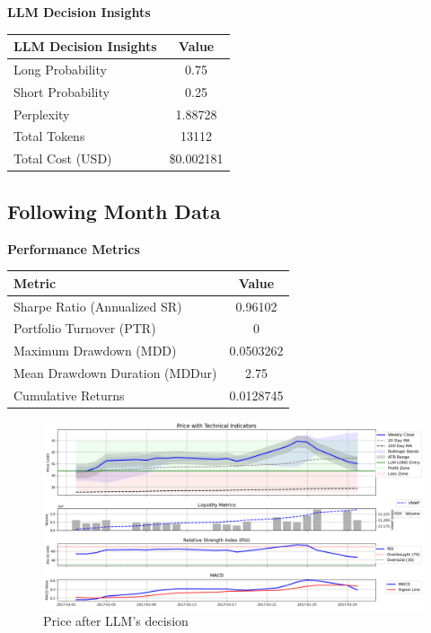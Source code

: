\documentclass[8pt]{scrartcl}
\begin{document}
\textbf{LLM Decision Insights}

\begin{longtable}{l c}
\toprule
\textbf{LLM Decision Insights} & \textbf{Value} \\
\midrule
Long Probability & 0.75 \\
Short Probability & 0.25 \\
Perplexity & 1.88728   \\
\midrule
Total Tokens & 13112 \\
Total Cost (USD) & \$0.002181 \\
\bottomrule
\end{longtable}

\subsection*{Following Month Data}

\textbf{Performance Metrics}

\begin{longtable}{l c}
\toprule
\textbf{Metric} & \textbf{Value} \\
\midrule
Sharpe Ratio (Annualized SR) & 0.96102 \\
Portfolio Turnover (PTR) & 0 \\
Maximum Drawdown (MDD) & 0.0503262 \\
Mean Drawdown Duration (MDDur) & 2.75 \\
Cumulative Returns & 0.0128745 \\
\bottomrule
\end{longtable}

\begin{figure}[H]
    \centering
    \includegraphics[width=1\linewidth]{judge_reviews/GOOGL_M_gpt-4o-mini/2017-01-02/llm_Price_with_Technical_Indicators.png}
    \caption{Price after LLM's decision}
\end{figure}
\end{document}
